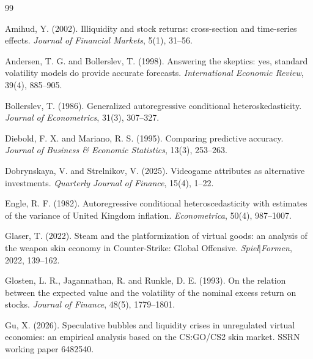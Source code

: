 \documentclass[11pt,a4paper]{article}
\begin{document}
\begin{thebibliography}{99}

Amihud, Y. (2002).
\newblock Illiquidity and stock returns: cross-section and time-series effects.
\newblock \emph{Journal of Financial Markets}, 5(1), 31--56.

Andersen, T. G. and Bollerslev, T. (1998).
\newblock Answering the skeptics: yes, standard volatility models do provide
accurate forecasts.
\newblock \emph{International Economic Review}, 39(4), 885--905.

Bollerslev, T. (1986).
\newblock Generalized autoregressive conditional heteroskedasticity.
\newblock \emph{Journal of Econometrics}, 31(3), 307--327.

Diebold, F. X. and Mariano, R. S. (1995).
\newblock Comparing predictive accuracy.
\newblock \emph{Journal of Business \& Economic Statistics}, 13(3), 253--263.

Dobrynskaya, V. and Strelnikov, V. (2025).
\newblock Videogame attributes as alternative investments.
\newblock \emph{Quarterly Journal of Finance}, 15(4), 1--22.

Engle, R. F. (1982).
\newblock Autoregressive conditional heteroscedasticity with estimates of the
variance of United Kingdom inflation.
\newblock \emph{Econometrica}, 50(4), 987--1007.

Glaser, T. (2022).
\newblock Steam and the platformization of virtual goods: an analysis of the
weapon skin economy in Counter-Strike: Global Offensive.
\newblock \emph{Spiel$\vert$Formen}, 2022, 139--162.

Glosten, L. R., Jagannathan, R. and Runkle, D. E. (1993).
\newblock On the relation between the expected value and the volatility of the
nominal excess return on stocks.
\newblock \emph{Journal of Finance}, 48(5), 1779--1801.

Gu, X. (2026).
\newblock Speculative bubbles and liquidity crises in unregulated virtual
economies: an empirical analysis based on the CS:GO/CS2 skin market.
\newblock SSRN working paper 6482540.


\end{thebibliography}
\end{document}
